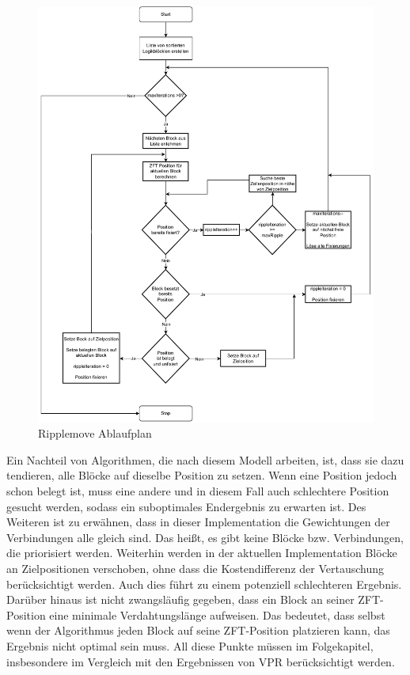         \begin{figure}[H]
            \centering
            \includegraphics[width=\textwidth]{img/flowchart.pdf}
            \caption{Ripplemove Ablaufplan}
            \label{fig:algo-flowchart}
        \end{figure}
        Ein Nachteil von Algorithmen, die nach diesem Modell arbeiten, ist,
        dass sie dazu tendieren, alle Blöcke auf dieselbe Position zu setzen.
        Wenn eine Position jedoch schon belegt ist, muss eine andere und in diesem
        Fall auch schlechtere Position gesucht werden, sodass ein suboptimales
        Endergebnis zu erwarten ist. Des Weiteren ist zu erwähnen, dass in dieser
        Implementation die Gewichtungen der Verbindungen alle gleich sind.
        Das heißt, es gibt keine Blöcke bzw. Verbindungen, die priorisiert werden.
        Weiterhin werden in der aktuellen Implementation Blöcke an Zielpositionen
        verschoben, ohne dass die Kostendifferenz der Vertauschung berücksichtigt werden.
        Auch dies führt zu einem potenziell schlechteren Ergebnis.
        Darüber hinaus ist nicht zwangsläufig gegeben, dass ein Block an seiner
        ZFT-Position eine minimale Verdahtungslänge aufweisen.
        Das bedeutet, dass selbst wenn der Algorithmus jeden Block auf seine
        ZFT-Position platzieren kann, das Ergebnis nicht optimal sein muss.
        All diese Punkte müssen im Folgekapitel, insbesondere im Vergleich mit den
        Ergebnissen von VPR berücksichtigt werden.


